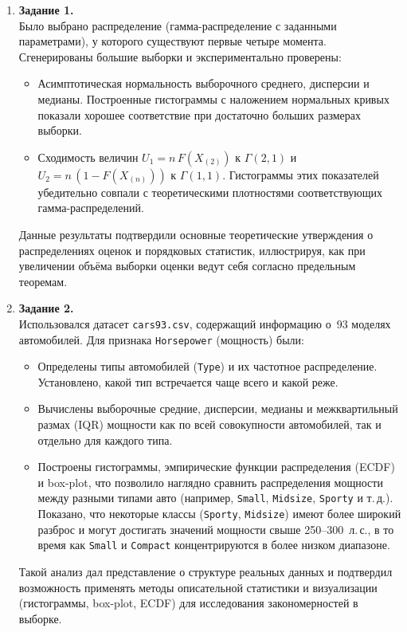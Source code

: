 \documentclass[a4paper,12pt]{article}
\begin{document}
\begin{enumerate}
    \item \textbf{Задание 1.}\\
    Было выбрано распределение (гамма-распределение с заданными параметрами), у которого существуют первые четыре момента. Сгенерированы большие выборки и экспериментально проверены:
    \begin{itemize}
        \item Асимптотическая нормальность выборочного среднего, дисперсии и медианы. Построенные гистограммы с наложением нормальных кривых показали хорошее соответствие при достаточно больших размерах выборки.
        \item Сходимость величин \(U_1 = n\,F(X_{(2)})\) к \(\Gamma(2,1)\) и \(U_2 = n\,(1 - F(X_{(n)}))\) к \(\Gamma(1,1)\). Гистограммы этих показателей убедительно совпали с теоретическими плотностями соответствующих гамма-распределений.
    \end{itemize}
    Данные результаты подтвердили основные теоретические утверждения о распределениях оценок и порядковых статистик, иллюстрируя, как при увеличении объёма выборки оценки ведут себя согласно предельным теоремам.

    \item \textbf{Задание 2.}\\
    Использовался датасет \texttt{cars93.csv}, содержащий информацию о~93 моделях автомобилей. Для признака \texttt{Horsepower} (мощность) были:
    \begin{itemize}
        \item Определены типы автомобилей (\texttt{Type}) и их частотное распределение. Установлено, какой тип встречается чаще всего и какой реже.
        \item Вычислены выборочные средние, дисперсии, медианы и межквартильный размах (IQR) мощности как по всей совокупности автомобилей, так и отдельно для каждого типа.
        \item Построены гистограммы, эмпирические функции распределения (ECDF) и box-plot, что позволило наглядно сравнить распределения мощности между разными типами авто (например, \texttt{Small}, \texttt{Midsize}, \texttt{Sporty} и т.\,д.). Показано, что некоторые классы (\texttt{Sporty}, \texttt{Midsize}) имеют более широкий разброс и могут достигать значений мощности свыше 250--300~л.\,с., в то время как \texttt{Small} и \texttt{Compact} концентрируются в более низком диапазоне.
    \end{itemize}
    Такой анализ дал представление о структуре реальных данных и подтвердил возможность применять методы описательной статистики и визуализации (гистограммы, box-plot, ECDF) для исследования закономерностей в выборке.

\end{enumerate}
\end{document}
